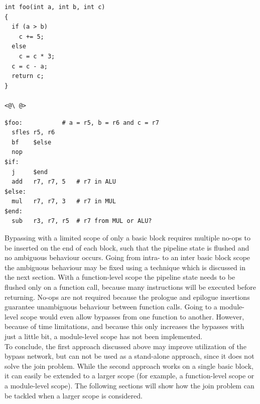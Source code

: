 \label{lst:join_problem}
\begin{center}
\hspace{2px}\begin{minipage}{.475\textwidth}
\lstset{style=customc}
\begin{lstlisting}[frame=tlrb]
int foo(int a, int b, int c)
{
  if (a > b)
    c += 5;
  else
    c = c * 3;
  c = c - a;
  return c;
}

<@\ @>
\end{lstlisting}
\end{minipage}\hfill
\begin{minipage}{.475\textwidth}
\lstset{style=customasm}
\begin{lstlisting}[frame=tlrb]
$foo:           # a = r5, b = r6 and c = r7
  sfles r5, r6
  bf    $else
  nop
$if:
  j     $end
  add   r7, r7, 5   # r7 in ALU
$else:
  mul   r7, r7, 3   # r7 in MUL 
$end:
  sub   r3, r7, r5  # r7 from MUL or ALU?
\end{lstlisting}
\end{minipage}
\end{center}

Bypassing with a limited scope of only a basic block requires multiple no-ops to be inserted on the end of each block, such that the pipeline state is flushed and no ambiguous behaviour occurs. Going from intra- to an inter basic block scope the ambiguous behaviour may be fixed using a technique which is discussed in the next section. With a function-level scope the pipeline state needs to be flushed only on a function call, because many instructions will be executed before returning. No-ops are not required because the prologue and epilogue insertions guarantee unambiguous behaviour between function calls. Going to a module-level scope would even allow bypasses from one function to another. However, because of time limitations, and because this only increases the bypasses with just a little bit, a module-level scope has not been implemented.\\

To conclude, the first approach discussed above may improve utilization of the bypass network, but can not be used as a stand-alone approach, since it does not solve the join problem. While the second approach works on a single basic block, it can easily be extended to a larger scope (for example, a function-level scope or a module-level scope). The following sections will show how the join problem can be tackled when a larger scope is considered. 

